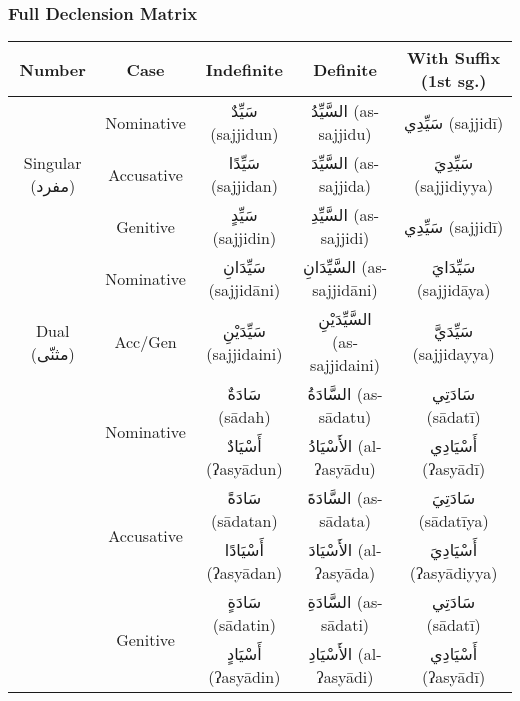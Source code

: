 \documentclass[letter,12pt]{article}
\begin{document}
\subsubsection*{Full Declension Matrix}

\begin{tabular}{|c|c|c|c|c|}
\hline
\textbf{Number} & \textbf{Case} & \textbf{Indefinite} & \textbf{Definite} & \textbf{With Suffix (1st sg.)} \\
\hline
\multirow{3}{*}{Singular (\textarabic{مفرد})} 
 & Nominative   & \textarabic{سَيِّدٌ} (sajjidun) & \textarabic{السَّيِّدُ} (as-sajjidu) & \textarabic{سَيِّدِي} (sajjidī) \\
 & Accusative   & \textarabic{سَيِّدًا} (sajjidan) & \textarabic{السَّيِّدَ} (as-sajjida) & \textarabic{سَيِّدِيَ} (sajjidiyya) \\
 & Genitive     & \textarabic{سَيِّدٍ} (sajjidin) & \textarabic{السَّيِّدِ} (as-sajjidi) & \textarabic{سَيِّدِي} (sajjidī) \\
\hline
\multirow{3}{*}{Dual (\textarabic{مثنّى})} 
 & Nominative   & \textarabic{سَيِّدَانِ} (sajjidāni) & \textarabic{السَّيِّدَانِ} (as-sajjidāni) & \textarabic{سَيِّدَايَ} (sajjidāya) \\
 & Acc/Gen      & \textarabic{سَيِّدَيْنِ} (sajjidaini) & \textarabic{السَّيِّدَيْنِ} (as-sajjidaini) & \textarabic{سَيِّدَيَّ} (sajjidayya) \\
\hline
\multirow{6}{*}{Plural (\textarabic{جمع})} 
  & \multirow{2}{*}{Nominative}    & \textarabic{سَادَةٌ} (sādah) & \textarabic{السَّادَةُ} (as-sādatu) & \textarabic{سَادَتِي} (sādatī) \\
  &                                                   & \textarabic{أَسْيَادٌ} (ʔasyādun) & \textarabic{الأَسْيَادُ} (al-ʔasyādu) & \textarabic{أَسْيَادِي} (ʔasyādī) \\
  & \multirow{2}{*}{Accusative}      & \textarabic{سَادَةً} (sādatan) & \textarabic{السَّادَةَ} (as-sādata) & \textarabic{سَادَتِيَ} (sādatīya) \\
  &                                                    & \textarabic{أَسْيَادًا} (ʔasyādan) & \textarabic{الأَسْيَادَ} (al-ʔasyāda) & \textarabic{أَسْيَادِيَ} (ʔasyādiyya) \\
  & \multirow{2}{*}{Genitive}          & \textarabic{سَادَةٍ} (sādatin) & \textarabic{السَّادَةِ} (as-sādati) & \textarabic{سَادَتِي} (sādatī) \\
  &                                                    & \textarabic{أَسْيَادٍ} (ʔasyādin) & \textarabic{الأَسْيَادِ} (al-ʔasyādi) & \textarabic{أَسْيَادِي} (ʔasyādī) \\
\hline
\end{tabular}
\end{document}
